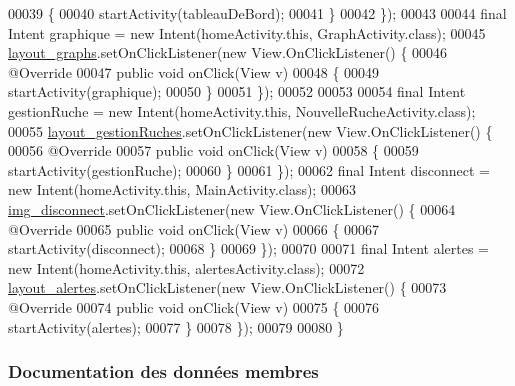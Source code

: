 \begin{DoxyCode}
00039             \{
00040                 startActivity(tableauDeBord);
00041             \}
00042         \});
00043 
00044         \textcolor{keyword}{final} Intent graphique = \textcolor{keyword}{new} Intent(homeActivity.this, GraphActivity.class);
00045         \hyperlink{classfr_1_1campus_1_1laurainc_1_1honeybee_1_1home_activity_acb650487a892f3446ae3f58ef01733b7}{layout\_graphs}.setOnClickListener(\textcolor{keyword}{new} View.OnClickListener() \{
00046             @Override
00047             \textcolor{keyword}{public} \textcolor{keywordtype}{void} onClick(View v)
00048             \{
00049                 startActivity(graphique);
00050             \}
00051         \});
00052 
00053 
00054         \textcolor{keyword}{final} Intent gestionRuche = \textcolor{keyword}{new} Intent(homeActivity.this, NouvelleRucheActivity.class);
00055         \hyperlink{classfr_1_1campus_1_1laurainc_1_1honeybee_1_1home_activity_aea8efb6a37f29b1a122844dcd3e26c0b}{layout\_gestionRuches}.setOnClickListener(\textcolor{keyword}{new} View.OnClickListener() \{
00056             @Override
00057             \textcolor{keyword}{public} \textcolor{keywordtype}{void} onClick(View v)
00058             \{
00059                 startActivity(gestionRuche);
00060             \}
00061         \});
00062         \textcolor{keyword}{final} Intent disconnect = \textcolor{keyword}{new} Intent(homeActivity.this, MainActivity.class);
00063         \hyperlink{classfr_1_1campus_1_1laurainc_1_1honeybee_1_1home_activity_ae29a1e0dd983c9e9f5554d37d6fc763e}{img\_disconnect}.setOnClickListener(\textcolor{keyword}{new} View.OnClickListener() \{
00064             @Override
00065             \textcolor{keyword}{public} \textcolor{keywordtype}{void} onClick(View v)
00066             \{
00067                 startActivity(disconnect);
00068             \}
00069         \});
00070 
00071         \textcolor{keyword}{final} Intent alertes = \textcolor{keyword}{new} Intent(homeActivity.this, alertesActivity.class);
00072         \hyperlink{classfr_1_1campus_1_1laurainc_1_1honeybee_1_1home_activity_aee95283002ad6087e895fa0fa51c5030}{layout\_alertes}.setOnClickListener(\textcolor{keyword}{new} View.OnClickListener() \{
00073             @Override
00074             \textcolor{keyword}{public} \textcolor{keywordtype}{void} onClick(View v)
00075             \{
00076                 startActivity(alertes);
00077             \}
00078         \});
00079 
00080     \}
\end{DoxyCode}


\subsubsection{Documentation des données membres}
\mbox{\label{classfr_1_1campus_1_1laurainc_1_1honeybee_1_1home_activity_ae29a1e0dd983c9e9f5554d37d6fc763e}} 
